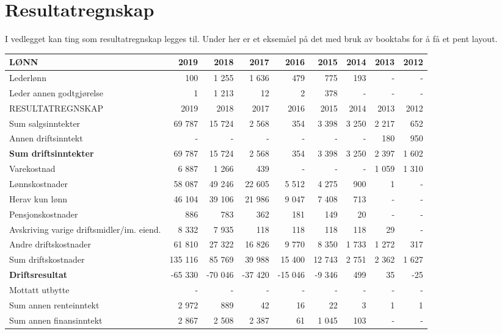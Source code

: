 
\section{Resultatregnskap}
I vedlegget kan ting som resultatregnskap legges til. Under her er et eksemåel på det med bruk av booktabs for å få et pent layout.

\begin{table}[H]
\scriptsize
\centering
\begin{tabular}{lrrrrrrrr}
\textsc{LØNN} & 2019 & 2018 & 2017 & 2016 & 2015 & 2014 & 2013 & 2012\\
\toprule
Lederlønn & 100 & 1 255 & 1 636 & 479 & 775 & 193 & - & -\\
Leder annen godtgjørelse & 1 & 1 213 & 12 & 2 & 378 & - & - & -\\
\addlinespace[15pt]
\textsc{RESULTATREGNSKAP} & 2019 & 2018 & 2017 & 2016 & 2015 & 2014 & 2013 & 2012 \\
\toprule
Sum salgsinntekter & 69 787 & 15 724 & 2 568 & 354 & 3 398 & 3 250 & 2 217 & 652 \\
Annen driftsinntekt & - & - & - & - & - & - & 180 & 950 \\
\textbf{Sum driftsinntekter} & 69 787 & 15 724 & 2 568 & 354 & 3 398 & 3 250 & 2 397 & 1 602 \\
\midrule
Varekostnad & 6 887 & 1 266 & 439 & - & - & - & 1 059 & 1 310 \\
Lønnskostnader & 58 087 & 49 246 & 22 605 & 5 512 & 4 275 & 900 & 1 & - \\
Herav kun lønn & 46 104 & 39 106 & 21 986 & 9 047 & 7 408 & 713 & - & - \\
Pensjonskostnader & 886 & 783 & 362 & 181 & 149 & 20 & - & - \\
Avskriving varige driftsmidler/im. eiend. & 8 332 & 7 935 & 118 & 118 & 118 & 118 & 29 & - \\
Andre driftskostnader & 61 810 & 27 322 & 16 826 & 9 770 & 8 350 & 1 733 & 1 272 & 317 \\
Sum driftskostnader & 135 116 & 85 769 & 39 988 & 15 400 & 12 743 & 2 751 & 2 362 & 1 627 \\
\textbf{Driftsresultat} & -65 330 & -70 046 & -37 420 & -15 046 & -9 346 & 499 & 35 & -25 \\
\midrule
Mottatt utbytte & - & - & - & - & - & - &-  & - \\
Sum annen renteinntekt & 2 972 & 889 & 42 & 16 & 22 & 3 & 1 & 1 \\
Sum annen finansinntekt & 2 867 & 2 508 & 2 387 & 61 & 1 045 & 103 & - & - \\

\end{tabular}
\end{table}
